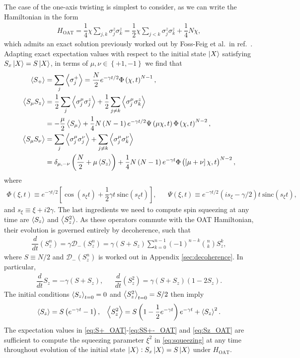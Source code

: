 \documentclass[aps,notitlepage,nofootinbib,11pt]{revtex4-1}
\renewcommand{\t}{\text} %
\newcommand{\f}[2]{\dfrac{#1}{#2}} %
\newcommand{\p}[1]{\left(#1\right)} %
\renewcommand{\sp}[1]{\left[#1\right]} %
\renewcommand{\set}[1]{\left\{#1\right\}} %
\newcommand{\bk}{\Braket} %
\newcommand{\D}{\mathcal{D}}
\newcommand{\1}{\mathds{1}}
\begin{document}
The case of the one-axis twisting is simplest to consider, as we can
write the Hamiltonian in the form
\begin{align}
  H_{\t{OAT}} = \f14 \chi \sum_{j,k} \sigma_j^z \sigma_k^z
  = \f12 \chi \sum_{j<k} \sigma_j^z \sigma_k^z + \f14 N \chi,
\end{align}
which admits an exact solution previously worked out by Foss-Feig et
al.~in ref.~\cite{foss-feig2013nonequilibrium}.  Adapting exact
expectation values with respect to the initial state $\ket{X}$
satisfying $S_x\ket{X}=S\ket{X}$, in terms of $\mu,\nu\in\set{+1,-1}$
we find that
\begin{align}
  \bk{S_+}
  &= \sum_j\bk{\sigma_j^+}
  = \f{N}{2} e^{-\gamma t/2} \Phi\p{\chi,t}^{N-1}, \label{eq:S+_OAT} \\
  \bk{S_\mu S_z}
  &= \f12\sum_j\bk{\sigma_j^\mu\sigma_j^z}
  + \f12\sum_{j\ne k} \bk{\sigma_j^\mu \sigma_k^z} \\
  &= -\f{\mu}{2}\bk{S_\mu} + \f14 N \p{N-1} e^{-\gamma t/2}
  \Psi\p{\mu\chi,t} \Phi\p{\chi,t}^{N-2}, \\
  \bk{S_\mu S_\nu}
  &= \sum_j \bk{\sigma_j^\mu \sigma_j^\nu}
  + \sum_{j\ne k} \bk{\sigma_j^\mu \sigma_k^\nu} \\
  &= \delta_{\mu,-\nu} \p{\f{N}{2} + \mu \bk{S_z}}
  + \f14 N \p{N-1} e^{-\gamma t}
  \Phi\p{\sp{\mu+\nu}\chi,t}^{N-2}, \label{eq:SS+-_OAT}
\end{align}
where
\begin{align}
  \Phi\p{\xi,t} \equiv e^{-\gamma t/2}
  \sp{\cos\p{s_\xi t}+\f12\gamma t~\t{sinc}\p{s_\xi t}},
  &&
  \Psi\p{\xi,t} \equiv e^{-\gamma t/2}
  \p{is_\xi-\gamma/2}t~ \t{sinc}\p{s_\xi t},
\end{align}
and $s_\xi \equiv \xi + i2\gamma$.  The last ingredients we need
to compute spin squeezing at any time are $\bk{S_z}$ and $\bk{S_z^2}$.
As these operators commute with the OAT Hamiltonian, their evolution
is governed entirely by decoherence, such that
\begin{align}
  \f{d}{dt}\p{S_z^n}
  = \gamma \D_-\p{S_z^n}
  = \gamma \p{S + S_z} \sum_{k=0}^{n-1}
  \p{-1}^{n-k} { n \choose k } S_z^k,
\end{align}
where $S\equiv N/2$ and $\D_-\p{S_z^n}$ is worked out in Appendix
\ref{sec:decoherence}.  In particular,
\begin{align}
  \f{d}{dt} S_z = -\gamma \p{S + S_z},
  &&
  \f{d}{dt}\p{S_z^2} = \gamma \p{S + S_z} \p{1 - 2S_z}.
\end{align}
The initial conditions $\bk{S_z}_{t=0}=0$ and $\bk{S_z^2}_{t=0}=S/2$
then imply
\begin{align}
  \bk{S_z} = S\p{e^{-\gamma t}-1},
  &&
  \bk{S_z^2} = S \p{1 - \f12 e^{-\gamma t}} e^{-\gamma t} + \bk{S_z}^2.
  \label{eq:Sz_OAT}
\end{align}
The expectation values in \eqref{eq:S+_OAT}-\eqref{eq:SS+-_OAT} and
\eqref{eq:Sz_OAT} are sufficient to compute the squeezing parameter
$\xi^2$ in \eqref{eq:squeezing} at any time throughout evolution of
the initial state $\ket{X}:S_x\ket{X}=S\ket{X}$ under $H_{\t{OAT}}$.
\end{document}
